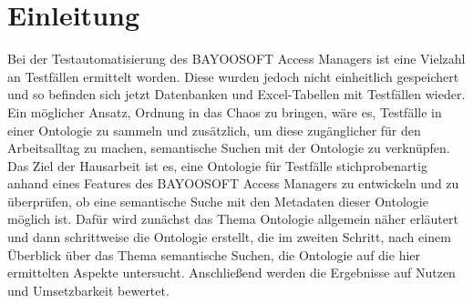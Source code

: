 \chapter{Einleitung}
Bei der Testautomatisierung des BAYOOSOFT Access Managers ist eine Vielzahl an Testfällen ermittelt worden. Diese wurden jedoch nicht einheitlich gespeichert und so befinden sich jetzt Datenbanken und Excel-Tabellen mit Testfällen wieder. Ein möglicher Ansatz, Ordnung in das Chaos zu bringen, wäre es, Testfälle in einer Ontologie zu sammeln und zusätzlich, um diese zugänglicher für den Arbeitsalltag zu machen, semantische Suchen mit der Ontologie zu verknüpfen. Das Ziel der Hausarbeit ist es, eine Ontologie für Testfälle stichprobenartig anhand eines Features des BAYOOSOFT Access Managers zu entwickeln und zu überprüfen, ob eine semantische Suche mit den Metadaten dieser Ontologie möglich ist. Dafür wird zunächst das Thema Ontologie allgemein näher erläutert und dann schrittweise die Ontologie erstellt, die im zweiten Schritt, nach einem Überblick über das Thema semantische Suchen, die Ontologie auf die hier ermittelten Aspekte untersucht. Anschließend werden die Ergebnisse auf Nutzen und Umsetzbarkeit bewertet.